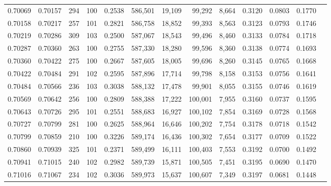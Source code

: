 \begin{tabular}{rrrrrrrrrrrrr}
0.70069 & 0.70157 &   294 & 100 &                                     0.2538 & 586,501 &  19,109 &  99,292 &   8,664 & 0.3120 & 0.0803 & 0.1770 \\
0.70158 & 0.70217 &   257 & 101 &                                     0.2821 & 586,758 &  18,852 &  99,393 &   8,563 & 0.3123 & 0.0793 & 0.1746 \\
0.70219 & 0.70286 &   309 & 103 &                                     0.2500 & 587,067 &  18,543 &  99,496 &   8,460 & 0.3133 & 0.0784 & 0.1718 \\
0.70287 & 0.70360 &   263 & 100 &                                     0.2755 & 587,330 &  18,280 &  99,596 &   8,360 & 0.3138 & 0.0774 & 0.1693 \\
0.70360 & 0.70422 &   275 & 100 &                                     0.2667 & 587,605 &  18,005 &  99,696 &   8,260 & 0.3145 & 0.0765 & 0.1668 \\
0.70422 & 0.70484 &   291 & 102 &                                     0.2595 & 587,896 &  17,714 &  99,798 &   8,158 & 0.3153 & 0.0756 & 0.1641 \\
0.70484 & 0.70566 &   236 & 103 &                                     0.3038 & 588,132 &  17,478 &  99,901 &   8,055 & 0.3155 & 0.0746 & 0.1619 \\
0.70569 & 0.70642 &   256 & 100 &                                     0.2809 & 588,388 &  17,222 & 100,001 &   7,955 & 0.3160 & 0.0737 & 0.1595 \\
0.70643 & 0.70726 &   295 & 101 &                                     0.2551 & 588,683 &  16,927 & 100,102 &   7,854 & 0.3169 & 0.0728 & 0.1568 \\
0.70727 & 0.70799 &   281 & 100 &                                     0.2625 & 588,964 &  16,646 & 100,202 &   7,754 & 0.3178 & 0.0718 & 0.1542 \\
0.70799 & 0.70859 &   210 & 100 &                                     0.3226 & 589,174 &  16,436 & 100,302 &   7,654 & 0.3177 & 0.0709 & 0.1522 \\
0.70860 & 0.70939 &   325 & 101 &                                     0.2371 & 589,499 &  16,111 & 100,403 &   7,553 & 0.3192 & 0.0700 & 0.1492 \\
0.70941 & 0.71015 &   240 & 102 &                                     0.2982 & 589,739 &  15,871 & 100,505 &   7,451 & 0.3195 & 0.0690 & 0.1470 \\
0.71016 & 0.71067 &   234 & 102 &                                     0.3036 & 589,973 &  15,637 & 100,607 &   7,349 & 0.3197 & 0.0681 & 0.1448 \\

\end{tabular}
